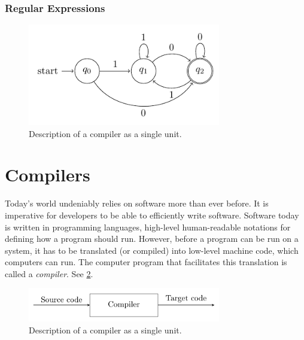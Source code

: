 \subsubsection{Regular Expressions} 

\begin{definition}
  \label{def:regular_exp}
\end{definition}






\begin{figure}[h]
  \caption{Description of a compiler as a single unit.}
  \label{fig:dfa}
  \centering
  \includegraphics[width=0.75\textwidth]{figures/dfa.pdf}
\end{figure}



  


\section{Compilers}


Today's world undeniably relies on software more than ever before. It is imperative for developers to be able to efficiently write software. Software today is written in programming languages, high-level human-readable notations for defining how a program should run. However, before a program can be run on a system, it has to be translated (or compiled) into low-level machine code, which computers can run. The computer program that facilitates this translation is called a \emph{compiler}. See \cref{fig:compiler}.

\begin{figure}[h]
  \caption{Description of a compiler as a single unit.}
  \label{fig:compiler}
  \centering
  \includegraphics[width=0.75\textwidth]{figures/compiler.pdf}
\end{figure}



